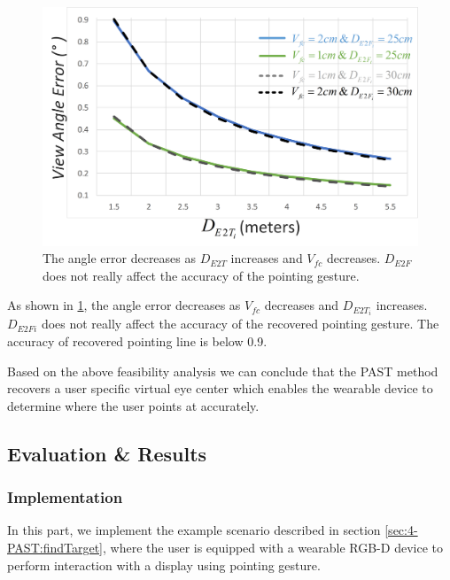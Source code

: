\begin{figure} [htb]
	\centering
	\includegraphics[width= \linewidth]{figures/4-PAST/EvaluationOfPointing.png}
	\caption{The angle error decreases as $D_{E2T}$ increases and $V_{fc}$ decreases. $D_{E2F}$ does not really affect the accuracy of the pointing gesture.}
	\label{fig:4-PAST:evaluatinOfPointing}
\end{figure}
As shown in \figurename{ \ref{fig:4-PAST:evaluatinOfPointing}}, the angle error decreases as $V_{fc}$ decreases and $D_{E2T_i}$ increases. $D_{E2Fi}$ does not really affect the accuracy of the recovered pointing gesture. The accuracy of recovered pointing line is below 0.9\degree.

Based on the above feasibility analysis we can conclude that the PAST method recovers a user specific virtual eye center which enables the wearable device to determine where the user points at accurately.

\subsection{Evaluation \& Results}
\subsubsection{Implementation}
In this part, we implement the example scenario described in section \ref{sec:4-PAST:findTarget}, where the user is equipped with a wearable RGB-D device to perform interaction with a display using pointing gesture.
